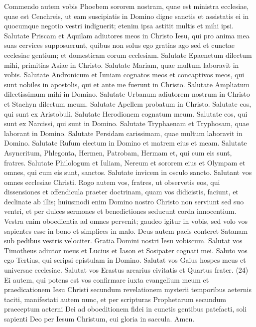 \begin{biblechapter}  
\verse Commendo autem vobis Phoebem sororem nostram, quae est ministra ecclesiae, quae est Cenchreis, 
\verse ut eam suscipiatis in Domino digne sanctis et assistatis ei in quocumque negotio vestri indiguerit; etenim ipsa astitit multis et mihi ipsi. 
\verse Salutate Priscam et Aquilam adiutores meos in Christo Iesu, 
\verse qui pro anima mea suas cervices supposuerunt, quibus non solus ego gratias ago sed et cunctae ecclesiae gentium; 
\verse et domesticam eorum ecclesiam. Salutate Epaenetum dilectum mihi, primitias Asiae in Christo. 
\verse Salutate Mariam, quae multum laboravit in vobis. 
\verse Salutate Andronicum et Iuniam cognatos meos et concaptivos meos, qui sunt nobiles in apostolis, qui et ante me fuerunt in Christo. 
\verse Salutate Ampliatum dilectissimum mihi in Domino. 
\verse Salutate Urbanum adiutorem nostrum in Christo et Stachyn dilectum meum. 
\verse Salutate Apellem probatum in Christo. Salutate eos, qui sunt ex Aristobuli.  
\verse Salutate Herodionem cognatum meum. Salutate eos, qui sunt ex Narcissi, qui sunt in Domino. 
\verse Salutate Tryphaenam et Tryphosam, quae laborant in Domino. Salutate Persidam carissimam, quae multum laboravit in Domino. 
\verse Salutate Rufum electum in Domino et matrem eius et meam. 
\verse Salutate Asyncritum, Phlegonta, Hermen, Patrobam, Hermam et, qui cum eis sunt, fratres.  
\verse Salutate Philologum et Iuliam, Nereum et sororem eius et Olympam et omnes, qui cum eis sunt, sanctos. 
\verse Salutate invicem in osculo sancto. Salutant vos omnes ecclesiae Christi. 
\verse Rogo autem vos, fratres, ut observetis eos, qui dissensiones et offendicula praeter doctrinam, quam vos didicistis, faciunt, et declinate ab illis; 
\verse huiusmodi enim Domino nostro Christo non serviunt sed suo ventri, et per dulces sermones et benedictiones seducunt corda innocentium. 
\verse Vestra enim oboedientia ad omnes pervenit; gaudeo igitur in vobis, sed volo vos sapientes esse in bono et simplices in malo. 
\verse Deus autem pacis conteret Satanam sub pedibus vestris velociter. Gratia Domini nostri Iesu vobiscum. 
\verse Salutat vos Timotheus adiutor meus et Lucius et Iason et Sosipater cognati mei. 
\verse Saluto vos ego Tertius, qui scripsi epistulam in Domino. 
\verse Salutat vos Gaius hospes meus et universae ecclesiae. Salutat vos Erastus arcarius civitatis et Quartus frater. (24) 
\verse Ei autem, qui potens est vos confirmare iuxta evangelium meum et praedicationem Iesu Christi secundum revelationem mysterii temporibus aeternis taciti, 
\verse manifestati autem nunc, et per scripturas Prophetarum secundum praeceptum aeterni Dei ad oboeditionem fidei in cunctis gentibus patefacti, 
\verse soli sapienti Deo per Iesum Christum, cui gloria in saecula. Amen.
\end{biblechapter}
